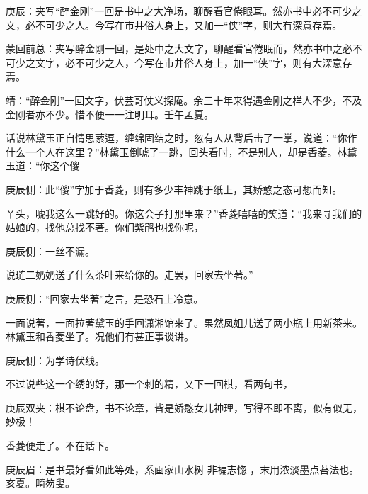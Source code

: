 \begin{parag}
    \begin{note}庚辰：夹写“醉金刚”一回是书中之大净场，聊醒看官倦眼耳。然亦书中必不可少之文，必不可少之人。今写在市井俗人身上，又加一“侠”字，则大有深意存焉。\end{note}
\end{parag}


\begin{parag}
    \begin{note}蒙回前总：夹写醉金刚一回，是处中之大文字，聊醒看官倦眠而，然亦书中之必不可少之文字，必不可少之人，今写在市井俗人身上，加一“侠”字，则有大深意存焉。\end{note}
\end{parag}


\begin{parag}
    \begin{note}靖：“醉金刚”一回文字，伏芸哥仗义探庵。余三十年来得遇金刚之样人不少，不及金刚者亦不少。惜不便一一注明耳。壬午孟夏。\end{note}
\end{parag}


\begin{parag}
    话说林黛玉正自情思萦逗，缠绵固结之时，忽有人从背后击了一掌，说道：“你作什么一个人在这里？”林黛玉倒唬了一跳，回头看时，不是别人，却是香菱。林黛玉道：“你这个傻\begin{note}庚辰侧：此“傻”字加于香菱，则有多少丰神跳于纸上，其娇憨之态可想而知。\end{note}丫头，唬我这么一跳好的。你这会子打那里来？”香菱嘻嘻的笑道：“我来寻我们的姑娘的，找他总找不著。你们紫鹃也找你呢，\begin{note}庚辰侧：一丝不漏。\end{note}说琏二奶奶送了什么茶叶来给你的。走罢，回家去坐著。”\begin{note}庚辰侧：“回家去坐著”之言，是恐石上冷意。\end{note}一面说著，一面拉著黛玉的手回潇湘馆来了。果然凤姐儿送了两小瓶上用新茶来。林黛玉和香菱坐了。况他们有甚正事谈讲。\begin{note}庚辰侧：为学诗伏线。\end{note}不过说些这一个绣的好，那一个刺的精，又下一回棋，看两句书，\begin{note}庚辰双夹：棋不论盘，书不论章，皆是娇憨女儿神理，写得不即不离，似有似无，妙极！\end{note}香菱便走了。不在话下。\begin{note}庚辰眉：是书最好看如此等处，系画家山水树 非褊志惚 ，末用浓淡墨点苔法也。亥夏。畸笏叟。\end{note}
\end{parag}


